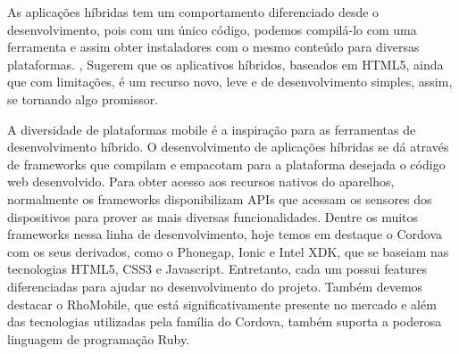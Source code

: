 As aplicações híbridas tem um comportamento diferenciado desde o desenvolvimento, pois com um único código, podemos compilá-lo com uma ferramenta e assim obter instaladores com o mesmo conteúdo para diversas plataformas. \cite{6530464}, Sugerem que os aplicativos híbridos, baseados em HTML5, ainda que com limitações, é um recurso novo, leve e de desenvolvimento simples, assim, se tornando algo promissor.


A diversidade de plataformas mobile é a inspiração para as ferramentas de desenvolvimento híbrido. O desenvolvimento de aplicações híbridas se dá através de frameworks que compilam e empacotam para a plataforma desejada o código web desenvolvido. Para obter acesso aos recursos nativos do aparelhos, normalmente os frameworks disponibilizam APIs que acessam os sensores dos dispositivos para prover as mais diversas funcionalidades. Dentre os muitos frameworks nessa linha de desenvolvimento, hoje temos em destaque o Cordova com os seus derivados, como o Phonegap, Ionic e Intel XDK, que se baseiam nas tecnologias HTML5, CSS3 e Javascript. Entretanto, cada um possui features diferenciadas para ajudar no desenvolvimento do projeto. Também devemos destacar o RhoMobile, que está significativamente presente no mercado e além das tecnologias utilizadas pela família do Cordova, também suporta a poderosa linguagem de programação Ruby.






